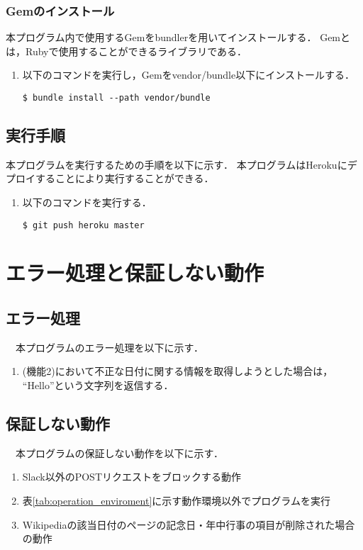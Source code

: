\documentclass[fleqn, 14pt]{extarticlej}
\begin{document}
\subsubsection{Gemのインストール}
本プログラム内で使用するGemをbundlerを用いてインストールする．
Gemとは，Rubyで使用することができるライブラリである．
\begin{enumerate}
\item 以下のコマンドを実行し，Gemをvendor/bundle以下にインストールする．
\begin{verbatim}
$ bundle install --path vendor/bundle
\end{verbatim}
\end{enumerate}

\subsection{実行手順}
\label{sub:process}
本プログラムを実行するための手順を以下に示す．
本プログラムはHerokuにデプロイすることにより実行することができる．
\begin{enumerate}
\item 以下のコマンドを実行する．
\begin{verbatim}
$ git push heroku master
\end{verbatim}
\end{enumerate}

\section{エラー処理と保証しない動作}
\label{sec:error_handling}
\subsection{エラー処理}
　本プログラムのエラー処理を以下に示す．
\begin{enumerate}
\item %
  (機能2)において不正な日付に関する情報を取得しようとした場合は，
  ``Hello''という文字列を返信する．

\end{enumerate}
\subsection{保証しない動作}
　本プログラムの保証しない動作を以下に示す．
\begin{enumerate}
\item Slack以外のPOSTリクエストをブロックする動作
\item 表\ref{tab:operation_enviroment}に示す動作環境以外でプログラムを実行
\item Wikipediaの該当日付のページの記念日・年中行事の項目が削除された場合の動作
\end{enumerate}



\end{document}
